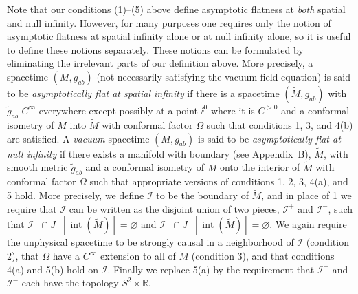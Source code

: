Note that our conditions (1)--(5) above define asymptotic flatness at \emph{both}
spatial and null infinity. However, for many purposes one requires only the notion
of asymptotic flatness at spatial infinity alone or at null infinity alone, so it is
useful to define these notions separately. These notions can be formulated by
eliminating the irrelevant parts of our definition above. More precisely, a spacetime
\((M,g_{ab})\) (not necessarily satisfying the vacuum field equation) is said to be
\emph{asymptotically flat at spatial infinity} if there is a spacetime
\((\tilde M,\tilde g_{ab})\) with \(\tilde g_{ab}\) \(C^\infty\) everywhere except
possibly at a point \(\ii^0\) where it is \(C^{>0}\) and a conformal isometry of \(M\)
into \(\tilde M\) with conformal factor \(\Omega\) such that conditions 1, 3, and 4(b)
are satisfied. A \emph{vacuum} spacetime \((M,g_{ab})\) is said to be
\emph{asymptotically flat at null infinity} if there exists a manifold with boundary
(see Appendix~B), \(\tilde M\), with smooth metric \(\tilde g_{ab}\) and a conformal
isometry of \(M\) onto the interior of \(\tilde M\) with conformal factor \(\Omega\)
such that appropriate versions of conditions 1, 2, 3, 4(a), and 5 hold. More
precisely, we define \(\mathcal I\) to be the boundary of \(\tilde M\), and in place of
1 we require that \(\mathcal I\) can be written as the disjoint union of two pieces,
\(\mathcal I^+\) and \(\mathcal I^-\), such that
\(\mathcal I^+\cap J^-[\operatorname{int}(\tilde M)]=\varnothing\) and
\(\mathcal I^-\cap J^+[\operatorname{int}(\tilde M)]=\varnothing\). We again
require the unphysical spacetime to be strongly causal in a neighborhood of
\(\mathcal I\) (condition 2), that \(\Omega\) have a \(C^\infty\) extension to all of
\(\tilde M\) (condition 3), and that conditions 4(a) and 5(b) hold on \(\mathcal I\).
Finally we replace 5(a) by the requirement that \(\mathcal I^+\) and \(\mathcal I^-\)
each have the topology \(S^2\times\mathbb R\).

